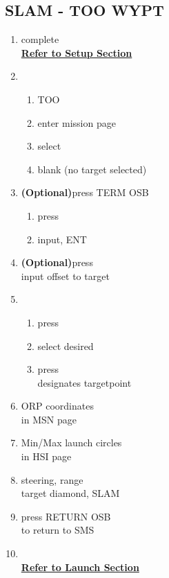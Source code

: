 \documentclass[fontInter, widesubsec]{TechCheck}
\begin{document}
	\subsection{SLAM - TOO WYPT}
	\begin{enumerate}
		\item {}\dotfill complete \\
		\hfill \hyperref[subsec:84setup]{\textbf{Refer to Setup Section}}
		\item {}
		\begin{enumerate}
			\item {}\dotfill TOO
			\item {}\dotfill enter mission page
			\item {}\dotfill select
			\item {}\dotfill blank (no target selected)
		\end{enumerate}
		\item {} \textbf{(Optional)}\dotfill press TERM OSB
		\begin{enumerate}
			\item {}\dotfill press
			\item {}\dotfill input, ENT
		\end{enumerate}
		\item {} \textbf{(Optional)}\dotfill press \\
		\hfill input offset to target
		\item {}
		\begin{enumerate}
			\item {}\dotfill press
			\item {}\dotfill select desired
			\item {}\dotfill press \\
			\hfill designates targetpoint
		\end{enumerate}
		\item {}\dotfill ORP coordinates\\
		\hfill  in MSN page
		\item {}\dotfill Min/Max launch circles\\
		\hfill in HSI page
		\item {}\dotfill steering, range \\
		\hfill  target diamond, SLAM
		\item {}\dotfill press RETURN OSB \\
		\hfill to return to SMS
		\item {} \\
		\hfill \hyperref[subsec:84launch]{\textbf{Refer to Launch Section}}
	\end{enumerate}
\end{document}
